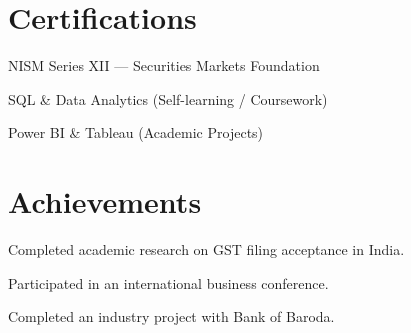 \documentclass[letterpaper,10.5pt]{article}
\begin{document}
\section{Certifications}
\begin{description}[noitemsep, topsep=1pt, partopsep=0pt]
  \item[] NISM Series XII — Securities Markets Foundation
  \item[] SQL \& Data Analytics (Self-learning / Coursework)
  \item[] Power BI \& Tableau (Academic Projects)
\end{description}

\section{Achievements}
\begin{description}[noitemsep, topsep=1pt, partopsep=0pt]
  \item[] Completed academic research on GST filing acceptance in India.
  \item[] Participated in an international business conference.
  \item[] Completed an industry project with Bank of Baroda.
\end{description}

\end{document}
